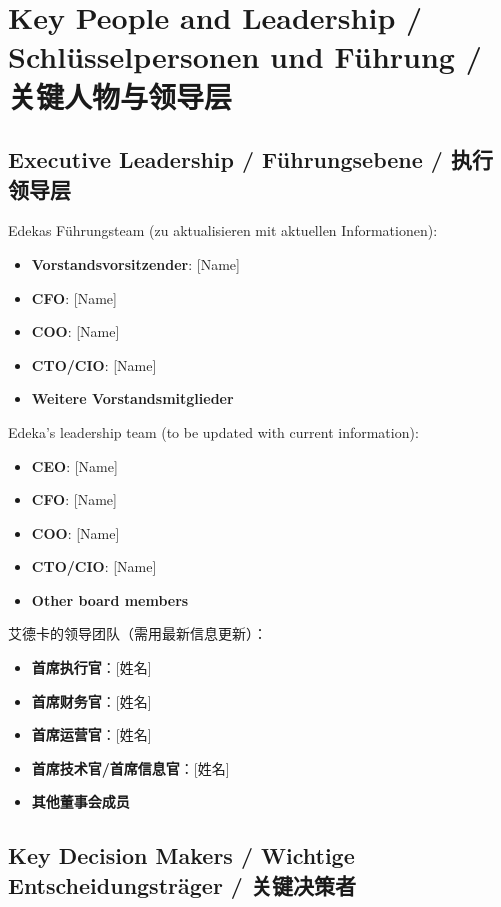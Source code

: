 \chapter{Key People and Leadership / Schlüsselpersonen und Führung / 关键人物与领导层}

\section{Executive Leadership / Führungsebene / 执行领导层}

\begin{otherlanguage}{ngerman}
Edekas Führungsteam (zu aktualisieren mit aktuellen Informationen):
\begin{itemize}
    \item \textbf{Vorstandsvorsitzender}: [Name]
    \item \textbf{CFO}: [Name]
    \item \textbf{COO}: [Name]
    \item \textbf{CTO/CIO}: [Name]
    \item \textbf{Weitere Vorstandsmitglieder}
\end{itemize}
\end{otherlanguage}

Edeka's leadership team (to be updated with current information):
\begin{itemize}
    \item \textbf{CEO}: [Name]
    \item \textbf{CFO}: [Name]
    \item \textbf{COO}: [Name]
    \item \textbf{CTO/CIO}: [Name]
    \item \textbf{Other board members}
\end{itemize}

艾德卡的领导团队（需用最新信息更新）：
\begin{itemize}
    \item \textbf{首席执行官}：[姓名]
    \item \textbf{首席财务官}：[姓名]
    \item \textbf{首席运营官}：[姓名]
    \item \textbf{首席技术官/首席信息官}：[姓名]
    \item \textbf{其他董事会成员}
\end{itemize}

\section{Key Decision Makers / Wichtige Entscheidungsträger / 关键决策者}

